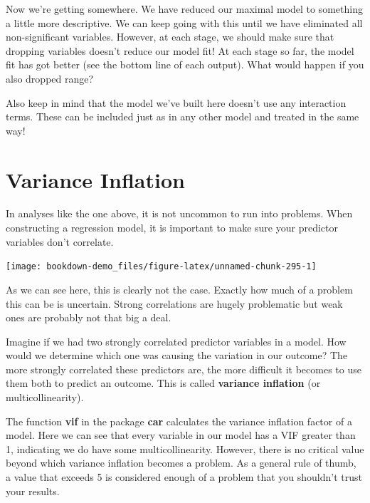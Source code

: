 \documentclass[
]{book}
\begin{document}
Now we're getting somewhere. We have reduced our maximal model to something a little more descriptive. We can keep going with this until we have eliminated all non-significant variables. However, at each stage, we should make sure that dropping variables doesn't reduce our model fit! At each stage so far, the model fit has got better (see the bottom line of each output). What would happen if you also dropped range?

Also keep in mind that the model we've built here doesn't use any interaction terms. These can be included just as in any other model and treated in the same way!

\hypertarget{variance-inflation}{%
\section{Variance Inflation}\label{variance-inflation}}

In analyses like the one above, it is not uncommon to run into problems. When constructing a regression model, it is important to make sure your predictor variables don't correlate.

\begin{center}\texttt{[image: bookdown-demo\_files/figure-latex/unnamed-chunk-295-1]} \end{center}

As we can see here, this is clearly not the case. Exactly how much of a problem this can be is uncertain. Strong correlations are hugely problematic but weak ones are probably not that big a deal.

Imagine if we had two strongly correlated predictor variables in a model. How would we determine which one was causing the variation in our outcome? The more strongly correlated these predictors are, the more difficult it becomes to use them both to predict an outcome. This is called \textbf{variance inflation} (or multicollinearity).

The function \textbf{vif} in the package \textbf{car} \citep{car} calculates the variance inflation factor of a model. Here we can see that every variable in our model has a VIF greater than 1, indicating we do have some multicollinearity. However, there is no critical value beyond which variance inflation becomes a problem. As a general rule of thumb, a value that exceeds 5 is considered enough of a problem that you shouldn't trust your results.
\end{document}
